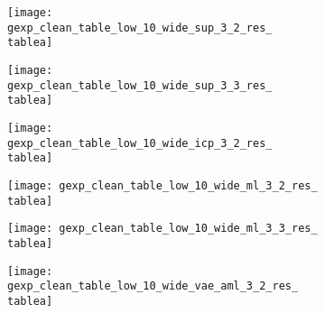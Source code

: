\begin{figure*}[t]
{\begin{subfigure}[t]{1\textwidth}
\begin{subfigure}[t]{0.095\textwidth}
   			\vspace{0px}\centering
   			\texttt{[image: gexp\_clean\_table\_low\_10\_wide\_sup\_3\_2\_res\_\\tablea]}
   		\end{subfigure}
   		\begin{subfigure}[t]{0.095\textwidth}
   			\vspace{0px}\centering
   			\texttt{[image: gexp\_clean\_table\_low\_10\_wide\_sup\_3\_3\_res\_\\tablea]}
   		\end{subfigure}
   		\begin{subfigure}[t]{0.095\textwidth}
   			\vspace{0px}\centering
   			\texttt{[image: gexp\_clean\_table\_low\_10\_wide\_icp\_3\_2\_res\_\\tablea]}
   		\end{subfigure}
        \begin{subfigure}[t]{0.095\textwidth}
            \vspace{0px}\centering
            \texttt{[image: gexp\_clean\_table\_low\_10\_wide\_ml\_3\_2\_res\_\\tablea]}
        \end{subfigure}
   		\begin{subfigure}[t]{0.095\textwidth}
   			\vspace{0px}\centering
   			\texttt{[image: gexp\_clean\_table\_low\_10\_wide\_ml\_3\_3\_res\_\\tablea]}
   		\end{subfigure}
   		\begin{subfigure}[t]{0.095\textwidth}
   			\vspace{0px}\centering
   			\texttt{[image: gexp\_clean\_table\_low\_10\_wide\_vae\_aml\_3\_2\_res\_\\tablea]}
   		\end{subfigure}
   		\begin{subfigure}[t]{0.095\textwidth}
   			\vspace{0px}\centering

\end{subfigure}
\end{subfigure}}
\end{figure*}
